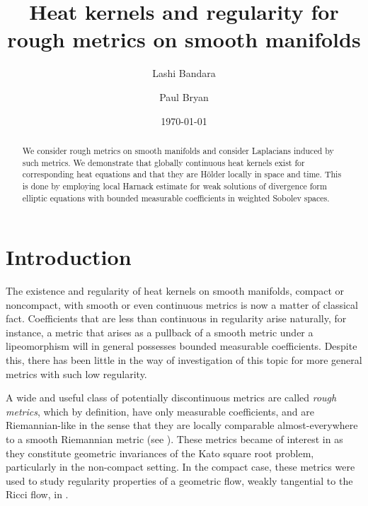 \documentclass[a4paper, 12pt]{amsart}
\begin{document}
\title[Heat kernels and regularity for rough metrics]{Heat kernels and regularity for rough metrics on smooth manifolds}

\author{Lashi Bandara}
\author{Paul Bryan}

\curraddr{}
\email{}
\date{\today}

\dedicatory{}
\subjclass[2010]{}
\keywords{}

\maketitle

\setcounter{tocdepth}{1}
\tableofcontents

\parindent0cm
\setlength{\parskip}{\baselineskip}


\begin{abstract}
We consider rough metrics on smooth manifolds and consider Laplacians induced by such metrics.
We demonstrate  that globally continuous heat kernels exist for corresponding heat equations 
and that they are Hölder locally in space and time. 
This is done by employing local Harnack estimate for weak
solutions of divergence form elliptic equations
with bounded measurable coefficients in weighted Sobolev spaces.
\end{abstract}


\section{Introduction}
\label{sec:intro}
The existence and regularity of heat kernels on smooth manifolds, compact or noncompact, 
with smooth or even continuous metrics  is now a matter of classical fact. 
Coefficients that are less than continuous in regularity arise naturally, for instance, a metric
that arises as a pullback of a smooth metric under a lipeomorphism will in general possesses bounded measurable
coefficients. Despite this, there has been
little in the way of investigation of this topic for more general metrics with such low regularity. 

A wide and useful class of potentially discontinuous metrics are called \emph{rough metrics}, 
which by definition, have only measurable coefficients, and are Riemannian-like in the sense
that they are locally comparable almost-everywhere to a smooth Riemannian metric (see ).
These metrics became of interest in \cite{BMc, BRough} as they constitute geometric invariances of the Kato square
root problem, particularly in the non-compact setting. 
In the compact case, these metrics were used to study regularity properties
of a geometric flow, weakly tangential to the Ricci flow, 
in \cite{BLM, BCont}.
\end{document}
